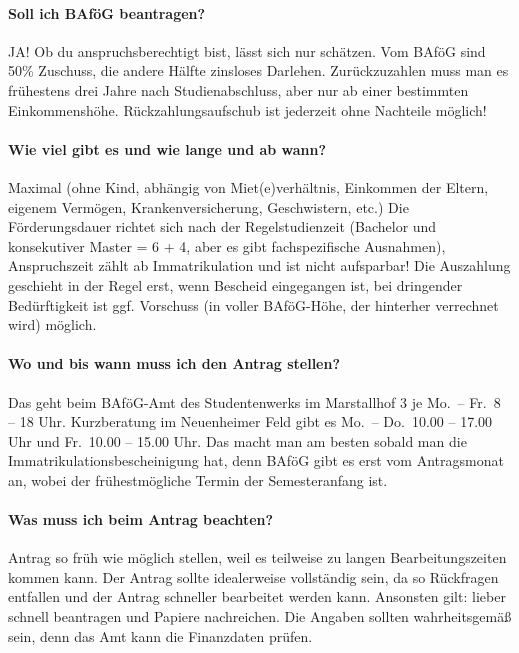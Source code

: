 
\paragraph{Soll ich BAföG beantragen?}
JA! Ob du anspruchsberechtigt bist, lässt sich nur schätzen. Vom BAföG sind 50\% Zuschuss, die andere Hälfte zinsloses Darlehen. Zurückzuzahlen muss man es frühestens drei Jahre nach Studienabschluss, aber nur ab einer bestimmten Einkommenshöhe. Rückzahlungsaufschub ist jederzeit ohne Nachteile möglich!

\paragraph{Wie viel gibt es und wie lange und ab wann?}
Maximal  (ohne Kind, abhängig von Miet(e)verhältnis, Einkommen der Eltern, eigenem Vermögen, Krankenversicherung, Geschwistern, etc.) Die Förderungsdauer richtet sich nach der Regelstudienzeit (Bachelor und konsekutiver Master = 6 + 4, aber es gibt fachspezifische Ausnahmen), Anspruchszeit zählt ab Immatrikulation und ist nicht aufsparbar! Die Auszahlung geschieht in der Regel erst, wenn Bescheid eingegangen ist, bei dringender Bedürftigkeit ist ggf. Vorschuss (in voller BAföG-Höhe, der hinterher verrechnet wird) möglich.

\paragraph{Wo und bis wann muss ich den Antrag stellen?}
Das geht beim BAföG-Amt des Studentenwerks im Marstallhof 3 je Mo.\ -- Fr.\ 8 – 18 Uhr. Kurzberatung im Neuenheimer Feld gibt es Mo.\ – Do.\ 10.00 -- 17.00 Uhr und Fr.\ 10.00 -- 15.00 Uhr. Das macht man am besten sobald man die Immatrikulationsbescheinigung hat, denn BAföG gibt es erst vom Antragsmonat an, wobei der frühestmögliche Termin der Semesteranfang ist.

\paragraph{Was muss ich beim Antrag beachten?}
Antrag so früh wie möglich stellen, weil es teilweise zu langen Bearbeitungszeiten kommen kann. Der Antrag sollte idealerweise vollständig sein, da so Rückfragen entfallen und der Antrag schneller bearbeitet werden kann. Ansonsten gilt: lieber schnell beantragen und Papiere nachreichen. Die Angaben sollten wahrheitsgemäß sein, denn das Amt kann die Finanzdaten prüfen.

